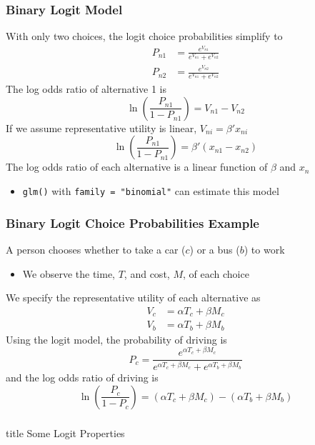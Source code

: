 \documentclass{beamer}\usepackage[]{graphicx}\usepackage[]{color}
\begin{document}
\begin{frame}\frametitle{Binary Logit Model}
    With only two choices, the logit choice probabilities simplify to
    \begin{align*}
    	P_{n1} &= \frac{e^{V_{n1}}}{e^{V_{n1}} + e^{V_{n2}}} \\
    	P_{n2} &= \frac{e^{V_{n2}}}{e^{V_{n1}} + e^{V_{n2}}}
    \end{align*}
    The log odds ratio of alternative 1 is
    $$\ln \left( \frac{P_{n1}}{1 - P_{n1}} \right) = V_{n1} - V_{n2}$$
    If we assume representative utility is linear, $V_{ni} = \beta' x_{ni}$
    $$\ln \left( \frac{P_{n1}}{1 - P_{n1}} \right) = \beta' (x_{n1} - x_{n2})$$
    The log odds ratio of each alternative is a linear function of $\beta$ and $x_n$
    \begin{itemize}
    	\item \texttt{glm()} with \texttt{family = "binomial"} can estimate this model
    \end{itemize}
\end{frame}

\begin{frame}\frametitle{Binary Logit Choice Probabilities Example}
    A person chooses whether to take a car ($c$) or a bus ($b$) to work
    \begin{itemize}
    	\item We observe the time, $T$, and cost, $M$, of each choice
    \end{itemize}
    \vspace{1ex}
    We specify the representative utility of each alternative as
    \begin{align*}
    	V_c &= \alpha T_c + \beta M_c \\
    	V_b &= \alpha T_b + \beta M_b
    \end{align*}
    Using the logit model, the probability of driving is
    $$P_c = \frac{e^{\alpha T_c + \beta M_c}}{e^{\alpha T_c + \beta M_c} + e^{\alpha T_b + \beta M_b}}$$
    and the log odds ratio of driving is
    $$\ln \left( \frac{P_c}{1 - P_c} \right) = (\alpha T_c + \beta M_c) - (\alpha T_b + \beta M_b)$$
\end{frame}

\begin{frame}\frametitle{}
    \vfill
    \centering
    \begin{beamercolorbox}[center]{title}
        \Large Some Logit Properties
    \end{beamercolorbox}
    \vfill
\end{frame}
\end{document}
